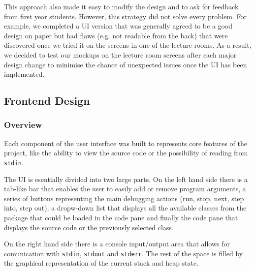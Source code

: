 \documentclass[11pt, a4paper]{article}
\begin{document}
This approach also made it easy to modify the design and to ask for feedback from first year students.
However, this strategy did not solve every problem.
For example, we completed a UI version that was generally agreed to be a good design on paper but had flaws (e.g. not readable from the back) that were discovered once we tried it on the screens in one of the lecture rooms.
As a result, we decided to test our mockups on the lecture room screens after each major design change to minimise the chance of unexpected issues once the UI has been implemented.

\subsection{Frontend Design}
\subsubsection{Overview}

Each component of the user interface was built to represents core features of the project, like the ability to view the source code or the possibility of reading from \texttt{stdin}.

The UI is esentially divided into two large parts.
On the left hand side there is a tab-like bar that enables the user to easily add or remove program arguments, a series of buttons representing the main debugging actions (run, stop, next, step into, step out), a dropw-down list that displays all the available classes from the package that could be loaded in the code pane and finally the code pane that displays the source code or the previously selected class.

On the right hand side there is a console input/output area that allows for comunication with \texttt{stdin}, \texttt{stdout} and \texttt{stderr}. The rest of the space is filled by the graphical representation of the current stack and heap state.
\end{document}
